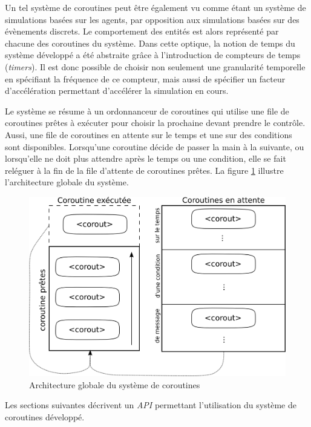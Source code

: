 \documentclass[12pt,twoside,letterpaper,francais]{book}
\begin{document}
Un tel système de coroutines peut être également vu comme étant un
système de simulations basées sur les agents, par opposition aux
simulations basées sur des évènements discrets. Le comportement des
entités est alors représenté par chacune des coroutines du
système. Dans cette optique, la notion de temps du système développé a
été abstraite grâce à l'introduction de compteurs de temps
(\textit{timers}). Il est donc possible de choisir non seulement une
granularité temporelle en spécifiant la fréquence de ce compteur, mais
aussi de spécifier un facteur d'accélération permettant d'accélérer la
simulation en cours.

Le système se résume à un ordonnanceur de coroutines qui utilise une
file de coroutines prêtes à exécuter pour choisir la prochaine devant
prendre le contrôle. Aussi, une file de coroutines en attente sur le
temps et une sur des conditions sont disponibles. Lorsqu'une coroutine
décide de passer la main à la suivante, ou lorsqu'elle ne doit plus
attendre après le temps ou une condition, elle se fait reléguer à la
fin de la file d'attente de coroutines prêtes. La figure
\ref{Corout:system-schema} illustre l'architecture globale du système.\\

\begin{figure}[htb!]
  \center
  \includegraphics[scale=0.7]{corout-system}
  \caption{Architecture globale du système de coroutines}
  \label{Corout:system-schema}
\end{figure}

 Les sections suivantes décrivent un \textit{API} permettant
l'utilisation du système de coroutines développé.
\end{document}
